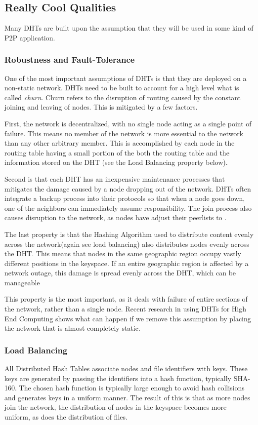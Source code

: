 \documentclass[10pt,letterpaper]{report}
\begin{document}
\subsection{Really Cool Qualities}
Many DHTs are built upon the assumption that they will be used in some kind of P2P application.
\subsubsection{Robustness and Fault-Tolerance}
One of the most important assumptions of DHTs is that they are deployed on a non-static network.
DHTs need to be built to account for a high level what is called \textit{churn}.  
Churn refers to the disruption of routing caused by the constant joining and leaving of nodes.
This is mitigated by a few factors.

First, the network is decentralized, with no single node acting as a single point of failure.
This means no member of the network is more essential to the network than any other arbitrary member. %
This is accomplished by each node in the routing table having a small portion of the both the routing table and the information stored on the DHT (see the Load Balancing property below).

Second is that each DHT has an inexpensive maintenance processes that mitigates the damage caused by a node dropping out of the network.
DHTs often integrate a backup process into their protocols so that when a node goes down, one of the neighbors can immediately assume responsibility.
The join process  also causes disruption to the network, as nodes have adjust their peerlists to  . 

The last property is that the Hashing Algorithm used to distribute content evenly across the network(again see load balancing) also distributes nodes evenly across the DHT.  
This means that nodes in the same geographic region occupy vastly different positions in the keyspace.  
If an entire geographic region is affected by a network outage, this damage is spread evenly across the DHT, which can be manageable

This property is the most important, as it deals with failure of entire sections of the network, rather than a single node.
Recent research in using DHTs for High End Computing \cite{li2013zht} shows what can happen if we remove this assumption by placing the network that is almost completely static.



\subsubsection{Load Balancing}
All Distributed Hash Tables associate nodes and file identifiers with keys.  
These keys are generated by passing the identifiers into a hash function, typically SHA-160.
The chosen hash function is typically large enough to avoid hash collisions and generates keys in a uniform manner. 
The result of this is that as more nodes join the network, the distribution of nodes in the keyspace becomes more uniform, as does the distribution of files.
\end{document}
